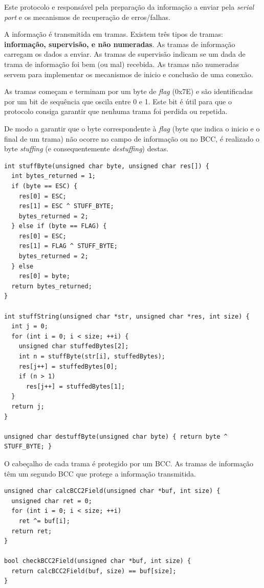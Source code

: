 \documentclass[11pt]{report}
\begin{document}
Este protocolo e responsável pela preparação da informação a enviar pela
\textit{serial port} e os mecanismos de recuperação de erros/falhas.

A informação é transmitida em tramas. Existem três tipos de tramas:
\textbf{informação, supervisão, e não numeradas}. As tramas de informação
carregam os dados a enviar. As tramas de supervisão indicam se um dada de
trama de informação foi bem (ou mal) recebida. As tramas não numeradas servem
para implementar os mecanismos de inicio e conclusão de uma conexão.

As tramas começam e terminam por um byte de \textit{flag} (0x7E) e são
identificadas por um bit de sequência que oscila entre 0 e 1. Este bit é útil
para que o protocolo consiga garantir que nenhuma trama foi perdida ou repetida.

De modo a garantir que o byte correspondente à \textit{flag} (byte que indica
o inicio e o final de um trama) não ocorre no campo de informação ou no BCC,
é realizado o byte \textit{stuffing} (e consequentemente \textit{destuffing})
destas.
\begin{lstlisting}
int stuffByte(unsigned char byte, unsigned char res[]) {
  int bytes_returned = 1;
  if (byte == ESC) {
    res[0] = ESC;
    res[1] = ESC ^ STUFF_BYTE;
    bytes_returned = 2;
  } else if (byte == FLAG) {
    res[0] = ESC;
    res[1] = FLAG ^ STUFF_BYTE;
    bytes_returned = 2;
  } else
    res[0] = byte;
  return bytes_returned;
}

int stuffString(unsigned char *str, unsigned char *res, int size) {
  int j = 0;
  for (int i = 0; i < size; ++i) {
    unsigned char stuffedBytes[2];
    int n = stuffByte(str[i], stuffedBytes);
    res[j++] = stuffedBytes[0];
    if (n > 1)
      res[j++] = stuffedBytes[1];
  }
  return j;
}

unsigned char destuffByte(unsigned char byte) { return byte ^ STUFF_BYTE; }
\end{lstlisting}

O cabeçalho de cada trama é protegido por um BCC. As tramas de informação têm um
segundo BCC que protege a informação transmitida.
\begin{lstlisting}
unsigned char calcBCC2Field(unsigned char *buf, int size) {
  unsigned char ret = 0;
  for (int i = 0; i < size; ++i)
    ret ^= buf[i];
  return ret;
}

bool checkBCC2Field(unsigned char *buf, int size) {
  return calcBCC2Field(buf, size) == buf[size];
}
\end{lstlisting}
\end{document}
